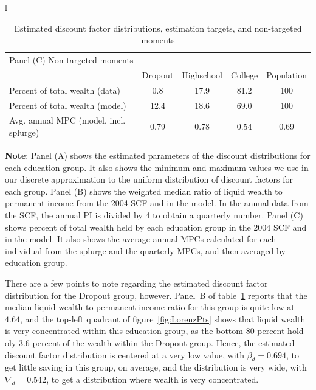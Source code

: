 \documentclass[../HAFiscal]{subfiles}
\begin{document}
\begin{table}[tp]
\begin{center}
\begin{tabular}{l}
	\begin{tabular}{lcccc}
		\multicolumn{5}{l}{Panel (C) Non-targeted moments} \\ 
		& Dropout & Highschool & College & Population \\ \midrule
		Percent of total wealth (data) & 0.8 & 17.9 & 81.2 & 100 \\
		Percent of total wealth (model) & 12.4 & 18.6 & 69.0 & 100 \\
		Avg. annual MPC (model, incl. splurge) & 0.79 & 0.78 & 0.54 & 0.69
		\\ \bottomrule 
	\end{tabular}
\end{tabular}
\caption{Estimated discount factor distributions, estimation targets, and non-targeted moments}
\label{tab:estimBetas}
\parbox{16cm}{\small \vspace{.15cm} \textbf{Note}: Panel (A) shows the estimated parameters of the discount distributions for each education group. It also shows the minimum and maximum values we use in our discrete approximation to the uniform distribution of discount factors for each group. Panel (B) shows the weighted median ratio of liquid wealth to permanent income from the 2004 SCF and in the model. In the annual data from the SCF, the annual PI is divided by 4 to obtain a quarterly number. Panel (C) shows percent of total wealth held by each education group in the 2004 SCF and in the model. It also shows the average annual MPCs calculated for each individual from the splurge and the quarterly MPCs, and then averaged by education group.\normalsize}
\end{center}
\end{table}

There are a few points to note regarding the estimated discount factor distribution for the Dropout group, however. Panel~B of table~\ref{tab:estimBetas} reports that the median liquid-wealth-to-permanent-income ratio for this group is quite low at $4.64$, and the top-left quadrant of figure~\ref{fig:LorenzPts} shows that liquid wealth is very concentrated within this education group, as the bottom 80 percent  hold oly $3.6$ percent of the wealth within the Dropout group. Hence, the estimated discount factor distribution is centered at a very low value, with $\beta_d=0.694$, to get little saving in this group, on average, and the distribution is very wide, with $\nabla_d=0.542$, to get a distribution where wealth is very concentrated. 
\end{document}
